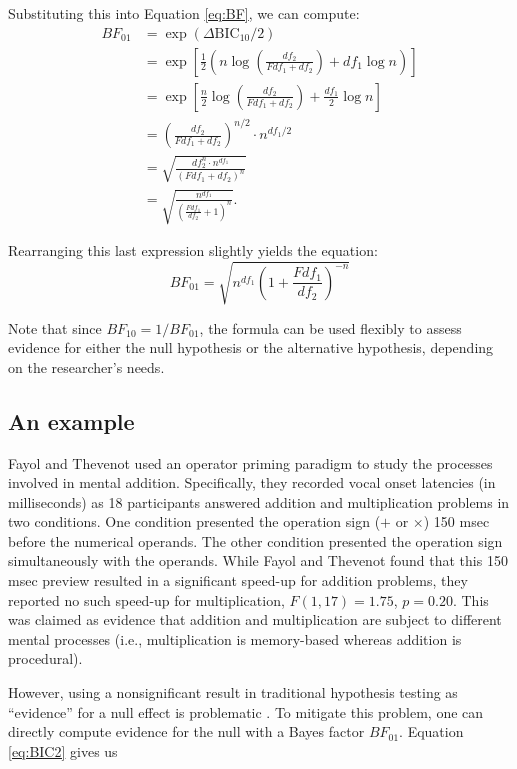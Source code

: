 \documentclass[]{article}
\begin{document}
\noindent
Substituting this into Equation \ref{eq:BF}, we can compute:
\begin{align*}
  BF_{01} & = \exp\left(\Delta\text{BIC}_{10}/2\right)\\
  & = \exp\left[ \frac{1}{2} \left( n\log\left(\frac{df_2}{Fdf_1 + df_2}\right) + df_1\log n\right)\right]\\
          & = \exp \left[\frac{n}{2}\log\left(\frac{df_2}{Fdf_1+df_2}\right) + \frac{df_1}{2}\log n\right]\\
          & = \left(\frac{df_2}{Fdf_1+df_2}\right)^{n/2} \cdot n^{df_1/2}\\
          & = \sqrt{\frac{df_2^n \cdot n^{df_1}}{(Fdf_1+df_2)^n}}\\
          &= \sqrt{\frac{n^{df_1}}{\left(\frac{Fdf_1}{df_2}+1\right)^n}}.
\end{align*}

Rearranging this last expression slightly yields the equation:
\begin{equation}\label{eq:BIC2}
BF_{01} = \sqrt{n^{df_1}\left(1+\frac{Fdf_1}{df_2}\right)^{-n}}
\end{equation}

\noindent
Note that since $BF_{10} = 1/BF_{01}$, the formula can be used flexibly to assess evidence for either the null hypothesis or the alternative hypothesis, depending on the researcher's needs.

\subsection{An example}

Fayol and Thevenot \cite{fayol2012} used an operator priming paradigm to study the processes involved in mental addition.  Specifically, they recorded vocal onset latencies (in milliseconds) as 18 participants answered addition and multiplication problems in two conditions.  One condition presented the operation sign ($+$ or $\times$) 150 msec before the numerical operands.  The other condition presented the operation sign simultaneously with the operands.  While Fayol and Thevenot found that this 150 msec preview resulted in a significant speed-up for addition problems, they reported no such speed-up for multiplication, $F(1,17)=1.75$, $p=0.20$.  This was claimed as evidence that addition and multiplication are subject to different mental processes (i.e., multiplication is memory-based whereas addition is procedural).

However, using a nonsignificant result in traditional hypothesis testing as ``evidence'' for a null effect is problematic \cite{wagenmakers2007}.  To mitigate this problem, one can directly compute evidence for the null with a Bayes factor $BF_{01}$.  Equation \ref{eq:BIC2} gives us
\end{document}

